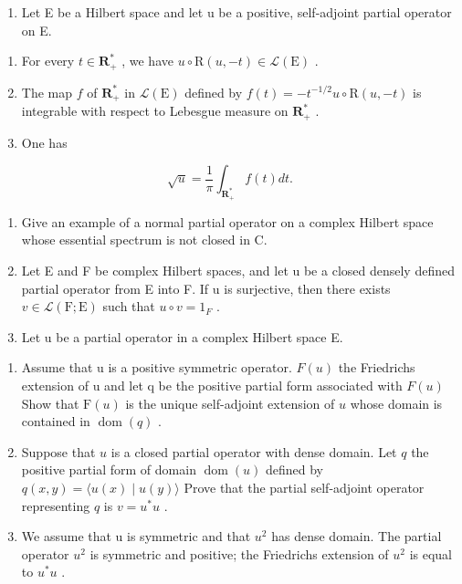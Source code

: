 \begin{enumerate}
\def\labelenumi{\arabic{enumi})}
\setcounter{enumi}{34}
\tightlist
\item
  Let E be a Hilbert space and let u be a positive, self-adjoint partial operator on E.
\end{enumerate}

\begin{enumerate}
\def\labelenumi{\alph{enumi})}
\item
  For every \(t \in \mathbf{R}_{+}^{*}\) , we have \(u \circ \mathrm{R}(u, -t) \in \mathcal{L}(\mathrm{E})\) .
\item
  The map \(f\) of \(\mathbf{R}_{+}^{*}\) in \(\mathcal{L}(\mathrm{E})\) defined by \(f(t) = -t^{-1/2}u \circ \mathrm{R}(u, -t)\) is integrable with respect to Lebesgue measure on \(\mathbf{R}_{+}^{*}\) .
\item
  One has
\end{enumerate}

\[
\sqrt {u} = \frac {1}{\pi} \int_ {\mathbf {R} _ {+} ^ {*}} f (t) d t.
\]

\begin{enumerate}
\def\labelenumi{\arabic{enumi})}
\setcounter{enumi}{35}
\item
  Give an example of a normal partial operator on a complex Hilbert space whose essential spectrum is not closed in C.
\item
  Let E and F be complex Hilbert spaces, and let u be a closed densely defined partial operator from E into F. If u is surjective, then there exists \(v \in \mathcal{L}(\mathrm{F}; \mathrm{E})\) such that \(u \circ v = 1_{F}\) .
\item
  Let u be a partial operator in a complex Hilbert space E.
\end{enumerate}

\begin{enumerate}
\def\labelenumi{\alph{enumi})}
\item
  Assume that u is a positive symmetric operator. \(F(u)\) the Friedrichs extension of u and let q be the positive partial form associated with \(F(u)\) Show that \(\mathrm{F}(u)\) is the unique self-adjoint extension of \(u\) whose domain is contained in \(\operatorname{dom}(q)\) .
\item
  Suppose that \(u\) is a closed partial operator with dense domain. Let \(q\) the positive partial form of domain \(\operatorname{dom}(u)\) defined by \(q(x,y) = \langle u(x) \mid u(y) \rangle\) Prove that the partial self-adjoint operator representing \(q\) is \(v = u^{*}u\) .
\item
  We assume that u is symmetric and that \(u^{2}\) has dense domain. The partial operator \(u^{2}\) is symmetric and positive; the Friedrichs extension of \(u^{2}\) is equal to \(u^{*}u\) .
\end{enumerate}

